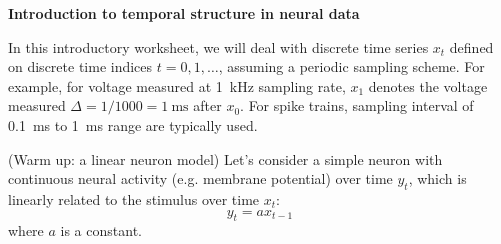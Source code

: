 \documentclass[letterpaper,11pt]{exam}
\DeclareMathOperator*{\E}{\mathbb{E}} %
\newcommand{\iidsample}{\stackrel{iid}{\sim}}
\newcommand{\normalDist}{\mathcal{N}}
\begin{document}
\vspace{-5mm}
\begin{center}
\textbf{\large
    Introduction to temporal structure in neural data
}
\end{center}

In this introductory worksheet, we will deal with discrete time series $x_t$ defined on discrete time indices $t = 0, 1, \ldots$, assuming a periodic sampling scheme.
For example, for voltage measured at \SI{1}{\kilo\hertz} sampling rate, $x_1$ denotes the voltage measured $\Delta = 1/1000 = \SI{1}{\milli\second}$ after $x_0$.
For spike trains, sampling interval of \SI{0.1}{\milli\second} to \SI{1}{\milli\second} range are typically used.

\begin{questions}
\question (Warm up: a linear neuron model)
Let's consider a simple neuron with continuous neural activity (e.g. membrane potential) over time $y_t$, which is linearly related to the stimulus over time $x_t$:
\begin{equation}\label{eq:linearneuron:1}
    y_{t} = a x_{t-1}
\end{equation}
where $a$ is a constant.
\end{questions}
\end{document}
